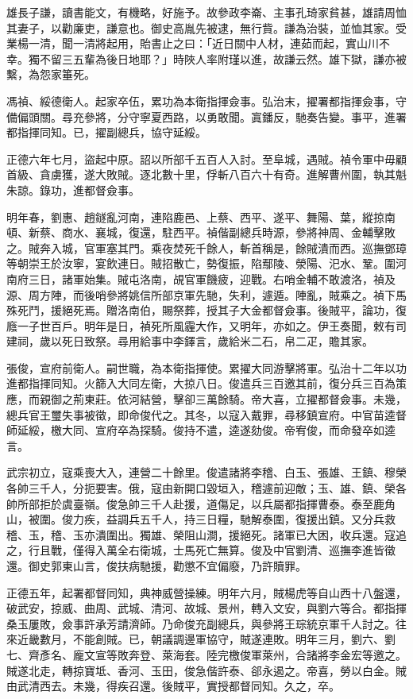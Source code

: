 \begin{pinyinscope}
雄長子謙，讀書能文，有機略，好施予。故參政李崙、主事孔琦家貧甚，雄請周恤其妻子，以勸廉吏，謙意也。御史高胤先被逮，無行貲。謙為治裝，並恤其家。受業楊一清，聞一清將起用，貽書止之曰：「近日關中人材，連茹而起，實山川不幸。獨不留三五輩為後日地耶？」時陜人率附瑾以進，故謙云然。雄下獄，謙亦被繫，為怨家箠死。

馮禎、綏德衛人。起家卒伍，累功為本衛指揮僉事。弘治末，擢署都指揮僉事，守備偏頭關。尋充參將，分守寧夏西路，以勇敢聞。寘鐇反，馳奏告變。事平，進署都指揮同知。已，擢副總兵，協守延綏。

正德六年七月，盜起中原。詔以所部千五百人入討。至阜城，遇賊。禎令軍中毋顧首級、貪虜獲，遂大敗賊。逐北數十里，俘斬八百六十有奇。進解曹州圍，執其魁朱諒。錄功，進都督僉事。

明年春，劉惠、趙鐩亂河南，連陷鹿邑、上蔡、西平、遂平、舞陽、葉，縱掠南頓、新蔡、商水、襄城，復還，駐西平。禎偕副總兵時源，參將神周、金輔擊敗之。賊奔入城，官軍塞其門。乘夜焚死千餘人，斬首稱是，餘賊潰而西。巡撫鄧璋等朝崇王於汝寧，宴飲連日。賊招散亡，勢復振，陷鄢陵、滎陽、汜水、鞏。圍河南府三日，諸軍始集。賊屯洛南，覘官軍饑疲，迎戰。右哨金輔不敢渡洛，禎及源、周方陣，而後哨參將姚信所部京軍先馳，失利，遽遁。陣亂，賊乘之。禎下馬殊死鬥，援絕死焉。贈洛南伯，賜祭葬，授其子大金都督僉事。後賊平，論功，復廕一子世百戶。明年是日，禎死所風霾大作，又明年，亦如之。伊王奏聞，敕有司建祠，歲以死日致祭。尋用給事中李鐸言，歲給米二石，帛二疋，贍其家。

張俊，宣府前衛人。嗣世職，為本衛指揮使。累擢大同游擊將軍。弘治十二年以功進都指揮同知。火篩入大同左衛，大掠八日。俊遣兵三百邀其前，復分兵三百為策應，而親御之荊東莊。依河結營，擊卻三萬餘騎。帝大喜，立擢都督僉事。未幾，總兵官王璽失事被徵，即命俊代之。其冬，以寇入戴罪，尋移鎮宣府。中官苗逵督師延綏，檄大同、宣府卒為探騎。俊持不遣，逵遂劾俊。帝宥俊，而命發卒如逵言。

武宗初立，寇乘喪大入，連營二十餘里。俊遣諸將李稽、白玉、張雄、王鎮、穆榮各帥三千人，分扼要害。俄，寇由新開口毀垣入，稽遽前迎敵；玉、雄、鎮、榮各帥所部拒於虞臺嶺。俊急帥三千人赴援，道傷足，以兵屬都指揮曹泰。泰至鹿角山，被圍。俊力疾，益調兵五千人，持三日糧，馳解泰圍，復援出鎮。又分兵救稽、玉，稽、玉亦潰圍出。獨雄、榮阻山澗，援絕死。諸軍已大困，收兵還。寇追之，行且戰，僅得入萬全右衛城，士馬死亡無算。俊及中官劉清、巡撫李進皆徵還。御史郭東山言，俊扶病馳援，勸懲不宜偏廢，乃許贖罪。

正德五年，起署都督同知，典神威營操練。明年六月，賊楊虎等自山西十八盤還，破武安，掠威、曲周、武城、清河、故城、景州，轉入文安，與劉六等合。都指揮桑玉屢敗，僉事許承芳請濟師。乃命俊充副總兵，與參將王琮統京軍千人討之。往來近畿數月，不能創賊。已，朝議調邊軍協守，賊遂連敗。明年三月，劉六、劉七、齊彥名、龐文宣等敗奔登、萊海套。陸完檄俊軍萊州，合諸將李金宏等邀之。賊遂北走，轉掠寶坻、香河、玉田，俊急偕許泰、郤永遏之。帝喜，勞以白金。賊由武清西去。未幾，得疾召還。後賊平，實授都督同知。久之，卒。


\end{pinyinscope}
